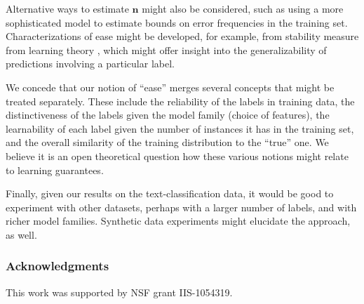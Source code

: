 \documentclass{article} %
\begin{document}
Alternative ways to estimate $\mathbf{n}$ might also be considered,
such as using a more sophisticated model to estimate bounds on error
frequencies in the training set.  Characterizations of
ease might be developed, for example, from
stability measure from learning theory \citep{mukherjee2006learning},
which might offer insight into the generalizability of predictions
involving a particular label.

We concede that our notion of ``ease'' merges several concepts that
might be treated separately.  These include the reliability of the
labels in training data, the distinctiveness of the labels given the
model family (choice of features), the learnability of each label
given the number of instances it has in the training set, and the
overall similarity of the training distribution to the ``true'' one.
We believe it is an open theoretical question how these various
notions might relate to learning guarantees.

Finally, given our results on the text-classification data,
it would be good to experiment with other datasets, perhaps with a
larger number of labels, and with richer model families.  Synthetic data
experiments might elucidate the approach, as well.


\subsubsection*{Acknowledgments}

This work was supported by NSF grant IIS-1054319.



\end{document}
